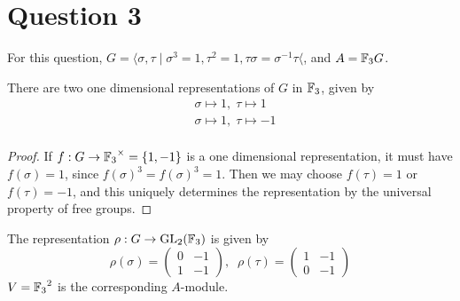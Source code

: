 \documentclass{unswmaths}
\begin{document}
\section*{Question 3}
For this question, $G = \langle \sigma,\tau\;|\;\sigma^3=1,\tau^2=1,\tau\sigma = \sigma^{-1}\tau\langle$,
and $A = {\mathbb{F}_3} G$.

\begin{theorem}
\label{1dimreps}
    There are two one dimensional representations of $G$ in ${\mathbb{F}_3}$, given by
    \begin{align*}
        &\sigma\mapsto 1,\;\tau\mapsto 1\\
        &\sigma\mapsto 1,\;\tau\mapsto -1\\
    \end{align*}
\end{theorem}
\begin{proof}
        If $f:G\rightarrow {\mathbb{F}_3}^\times = \{1,-1\}$ is a one dimensional representation, it
        must have $f(\sigma) = 1$, since $f(\sigma)^3 = f(\sigma)^3 = 1$. 
        Then we may choose $f(\tau) = 1$ or $f(\tau) = -1$, and this uniquely
        determines the representation by the universal property of free groups.
\end{proof}

\begin{definition}
    The representation $\rho:G\rightarrow \operatorname{GL}_2({\mathbb{F}_3})$ is given by
    \begin{equation*}
        \rho(\sigma) = \begin{pmatrix}
            0 & -1\\
            1 & -1
        \end{pmatrix},\;\;
        \rho(\tau) = \begin{pmatrix}
            1 & -1\\
            0 & -1
        \end{pmatrix}
    \end{equation*}
    $V = {\mathbb{F}_3}^2$ is the corresponding $A$-module.
\end{definition}
\end{document}

